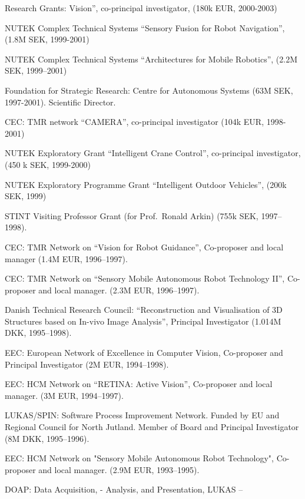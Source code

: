 \documentclass{article}
\begin{document}
\begin{cv}
\begin{cvlist}{Research Grants:}
  Vision'',  co-principal investigator, (180k EUR, 2000-2003)%
\item NUTEK Complex Technical Systems ``Sensory Fusion for Robot
  Navigation'', (1.8M SEK, 1999-2001)%
\item NUTEK Complex Technical Systems ``Architectures for Mobile
  Robotics'', (2.2M SEK, 1999--2001)%
\item Foundation for Strategic Research: Centre for Autonomous Systems
  (63M SEK, 1997-2001). Scientific Director.%
\item CEC: TMR network ``CAMERA'', co-principal investigator  (104k
  EUR, 1998-2001)%
\item NUTEK Exploratory Grant ``Intelligent Crane Control'',
  co-principal investigator, (450 k SEK, 1999-2000)%
\item NUTEK Exploratory Programme Grant ``Intelligent Outdoor
  Vehicles'', (200k SEK, 1999)%
\item STINT Visiting Professor Grant (for Prof.\ Ronald Arkin)  (755k
  SEK, 1997--1998).%
\item CEC: TMR Network on ``Vision for Robot Guidance'', Co-proposer
  and local manager (1.4M EUR, 1996--1997).%
\item CEC: TMR Network on ``Sensory Mobile Autonomous Robot Technology
  II'', Co-proposer and local manager.  (2.3M EUR, 1996--1997).%
\item Danish Technical Research Council: ``Reconstruction and
  Visualisation of 3D Structures based on In-vivo Image Analysis'',
  Principal Investigator (1.014M DKK, 1995--1998).%
\item EEC: European Network of Excellence in Computer Vision,
  Co-proposer and Principal Investigator (2M EUR, 1994--1998).%
\item EEC: HCM Network on ``RETINA: Active Vision'', Co-proposer and
  local manager.  (3M EUR, 1994--1997).%
\item LUKAS/SPIN: Software Process Improvement Network. Funded by EU
  and Regional Council for North Jutland. Member of Board and
  Principal Investigator (8M DKK, 1995--1996).%
\item EEC: HCM Network on "Sensory Mobile Autonomous Robot
  Technology", Co-proposer and local manager.  (2.9M EUR,
  1993--1995).%
\item DOAP: Data Acquisition, - Analysis, and Presentation, LUKAS --

\end{cvlist}
\end{cv}
\end{document}
